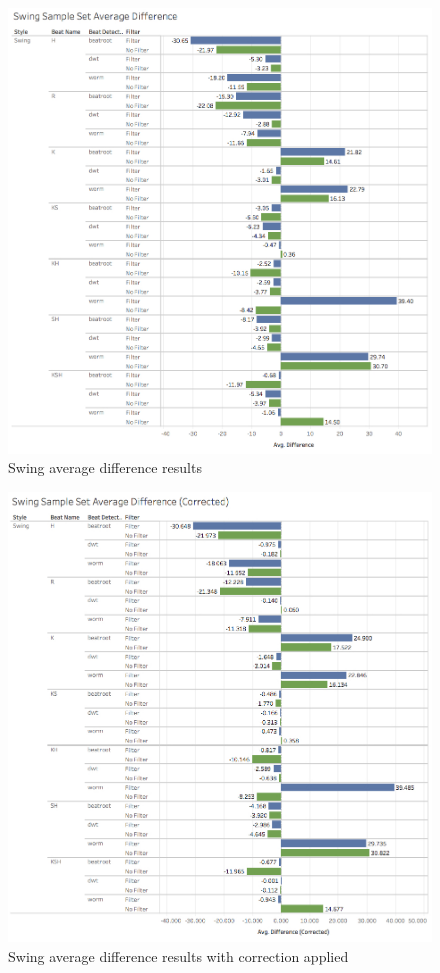 \documentclass[a4paper, 11pt]{article}
\begin{document}
\begin{figure}[h]
\centering
\includegraphics[scale=0.45]{images/SwiSSAD.jpg}
\caption{Swing average difference results}
\label{fig: swingAveDiff}
\end{figure}

\begin{figure}[h]
\centering
\includegraphics[scale=0.45]{images/SwiSSADC.jpg}
\caption{Swing average difference results with correction applied}
\label{fig: swingAveDiffCor}
\end{figure}
\end{document}
